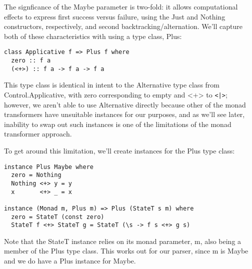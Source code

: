 \documentclass{tmr}
\begin{document}
The signficance of the Maybe parameter is two-fold:  it allows computational
effects to express first success versus failure, using the Just and Nothing 
constructors, respectively, and second backtracking/alternation.  We'll
capture both of these characteristics with using a type class, Plus:
\begin{verbatim}
class Applicative f => Plus f where
  zero :: f a
  (<+>) :: f a -> f a -> f a
\end{verbatim}
This type class is identical in intent to the Alternative type class from
Control.Applicative, with zero corresponding to empty and <+> to \verb+<|>+; 
however, we aren't able to use Alternative directly because
other of the monad transformers have unsuitable instances for our purposes,
and as we'll see later, inability to swap out such instances is one of the 
limitations of the monad transformer approach.  

To get around this limitation, we'll create instances for the Plus type class:
\begin{verbatim}
instance Plus Maybe where
  zero = Nothing
  Nothing <+> y = y
  x       <+> _ = x

instance (Monad m, Plus m) => Plus (StateT s m) where
  zero = StateT (const zero)
  StateT f <+> StateT g = StateT (\s -> f s <+> g s)
\end{verbatim}
Note that the StateT instance relies on its monad parameter, m, also being a 
member of the Plus type class.  This works out for our parser, since m is Maybe
and we do have a Plus instance for Maybe.
\end{document}
